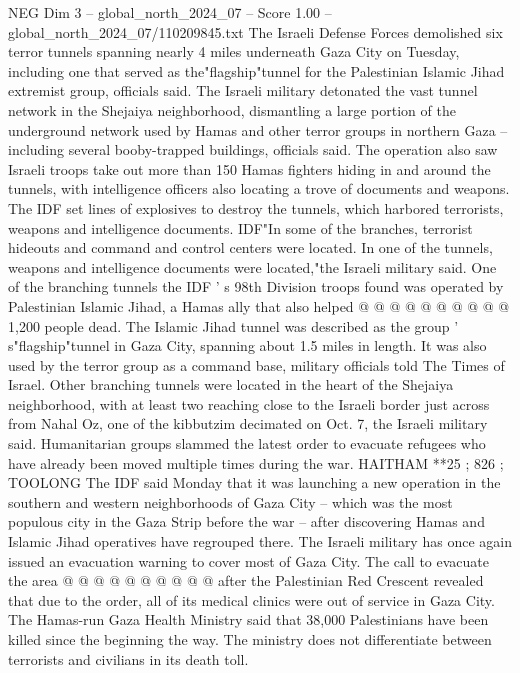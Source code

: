 \begin{textsample}{NEG Dim 3 – global\_north\_2024\_07 – Score 1.00 – global\_north\_2024\_07/110209845.txt}  \label{ex:f3_neg_372}
The Israeli Defense Forces demolished six terror tunnels spanning nearly 4 miles underneath Gaza City on Tuesday, including one that served as the"flagship"tunnel for the Palestinian Islamic Jihad extremist group, officials said.
The Israeli military detonated the vast tunnel network in the Shejaiya neighborhood, dismantling a large portion of the underground network used by Hamas and other terror groups in northern Gaza -- including several booby-trapped buildings, officials said.
The operation also saw Israeli troops take out more than 150 Hamas fighters hiding in and around the tunnels, with intelligence officers also locating a trove of documents and weapons.
The IDF set lines of explosives to destroy the tunnels, which harbored terrorists, weapons and intelligence documents.
IDF"In some of the branches, terrorist hideouts and command and control centers were located.
In one of the tunnels, weapons and intelligence documents were located,"the Israeli military said.
One of the branching tunnels the IDF ' s 98th Division troops found was operated by Palestinian Islamic Jihad, a Hamas ally that also helped @ @ @ @ @ @ @ @ @ @ 1,200 people dead.
The Islamic Jihad tunnel was described as the group ' s"flagship"tunnel in Gaza City, spanning about 1.5 miles in length.
It was also used by the terror group as a command base, military officials told The Times of Israel.
Other branching tunnels were located in the heart of the Shejaiya neighborhood, with at least two reaching close to the Israeli border just across from Nahal Oz, one of the kibbutzim decimated on Oct. 7, the Israeli military said.
Humanitarian groups slammed the latest order to evacuate refugees who have already been moved multiple times during the war.
HAITHAM **25 ; 826 ; TOOLONG The IDF said Monday that it was launching a new operation in the southern and western neighborhoods of Gaza City -- which was the most populous city in the Gaza Strip before the war -- after discovering Hamas and Islamic Jihad operatives have regrouped there.
The Israeli military has once again issued an evacuation warning to cover most of Gaza City.
The call to evacuate the area @ @ @ @ @ @ @ @ @ @ after the Palestinian Red Crescent revealed that due to the order, all of its medical clinics were out of service in Gaza City.
The Hamas-run Gaza Health Ministry said that 38,000 Palestinians have been killed since the beginning the way.
The ministry does not differentiate between terrorists and civilians in its death toll.

\end{textsample}
